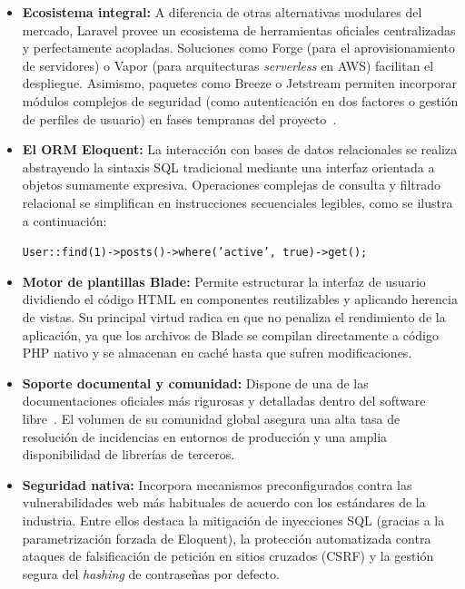 \begin{itemize}
    \item \textbf{Ecosistema integral:} A diferencia de otras alternativas modulares del mercado, Laravel provee un ecosistema de herramientas oficiales centralizadas y perfectamente acopladas. Soluciones como Forge (para el aprovisionamiento de servidores) o Vapor (para arquitecturas \textit{serverless} en AWS) facilitan el despliegue. Asimismo, paquetes como Breeze o Jetstream permiten incorporar módulos complejos de seguridad (como autenticación en dos factores o gestión de perfiles de usuario) en fases tempranas del proyecto~\cite{LaravelDocs}.

    \item \textbf{El ORM Eloquent:} La interacción con bases de datos relacionales se realiza abstrayendo la sintaxis SQL tradicional mediante una interfaz orientada a objetos sumamente expresiva. Operaciones complejas de consulta y filtrado relacional se simplifican en instrucciones secuenciales legibles, como se ilustra a continuación:
    \begin{center}
        \texttt{User::find(1)->posts()->where('active', true)->get();}
    \end{center}

    \item \textbf{Motor de plantillas Blade:} Permite estructurar la interfaz de usuario dividiendo el código HTML en componentes reutilizables y aplicando herencia de vistas. Su principal virtud radica en que no penaliza el rendimiento de la aplicación, ya que los archivos de Blade se compilan directamente a código PHP nativo y se almacenan en caché hasta que sufren modificaciones.

    \item \textbf{Soporte documental y comunidad:} Dispone de una de las documentaciones oficiales más rigurosas y detalladas dentro del software libre~\cite{LaravelDocs}. El volumen de su comunidad global asegura una alta tasa de resolución de incidencias en entornos de producción y una amplia disponibilidad de librerías de terceros.

    \item \textbf{Seguridad nativa:} Incorpora mecanismos preconfigurados contra las vulnerabilidades web más habituales de acuerdo con los estándares de la industria. Entre ellos destaca la mitigación de inyecciones SQL (gracias a la parametrización forzada de Eloquent), la protección automatizada contra ataques de falsificación de petición en sitios cruzados (CSRF) y la gestión segura del \textit{hashing} de contraseñas por defecto.
\end{itemize}


